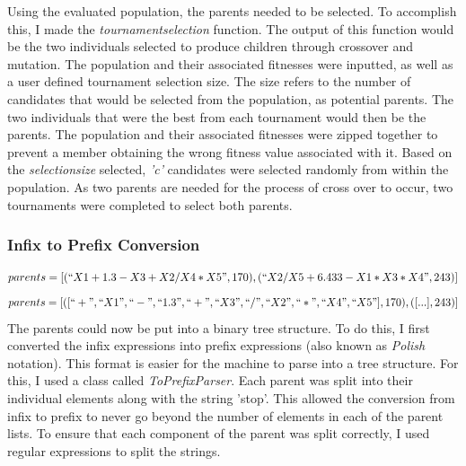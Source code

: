 \documentclass[11pt]{article}
\begin{document}
Using the evaluated population, the parents needed to be selected. To accomplish this, I made the \textit{tournament\textunderscore selection} function. The output of this function would be the two individuals selected to produce children through crossover and mutation. 
The population and their associated fitnesses were inputted, as well as a user defined tournament selection size. The size refers to the number of candidates that would be selected from the population, as potential parents. The two individuals that were the best from each tournament would then be the parents. The population and their associated fitnesses were zipped together to prevent a member obtaining the wrong fitness value associated with it. Based on the \textit{selection\textunderscore size} selected, \textit{'c'} candidates were selected randomly from within the population. As two parents are needed for the process of cross over to occur, two tournaments were completed to select both parents.
\subsubsection{Infix to Prefix Conversion}
\begin{equation}parents = [(``X1+1.3-X3+X2/X4*X5",170),( ``X2/X5+6.433-X1*X3*X4",243)] \end{equation} \begin{equation}parents = [([``+", ``X1", ``-", ``1.3", ``+", ``X3", ``/", ``X2", ``*", ``X4", ``X5"], 170),([...],243)] \end{equation}
The parents could now be put into a binary tree structure. To do this, I first converted the infix expressions into prefix expressions (also known as \textit{Polish} notation). This format is easier for the machine to parse into a tree structure.  For this, I used a class called \textit{ToPrefixParser}. Each parent was split into their individual elements along with the string 'stop'. This allowed the conversion from infix to prefix to never go beyond the number of elements in each of the parent lists. To ensure that each component of the parent was split correctly, I used regular expressions to split the strings. 
\end{document}
